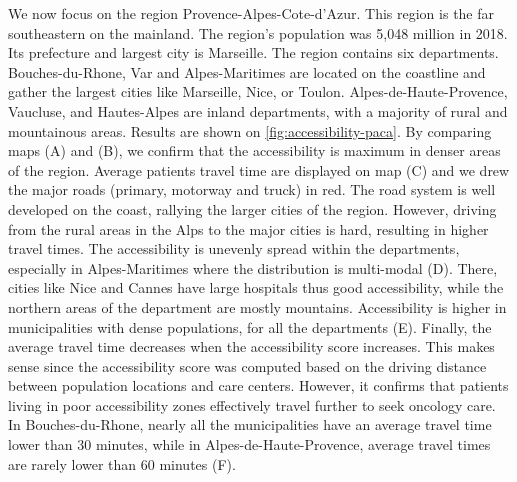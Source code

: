 We now focus on the region Provence-Alpes-Cote-d'Azur. This region is the far
southeastern on the mainland. The region's population was 5,048 million in 2018.
Its prefecture and largest city is Marseille. The region contains six
departments. Bouches-du-Rhone, Var and Alpes-Maritimes are located on the
coastline and gather the largest cities like Marseille, Nice, or Toulon.
Alpes-de-Haute-Provence, Vaucluse, and Hautes-Alpes are inland departments, with
a majority of rural and mountainous areas. Results are shown on
\cref{fig:accessibility-paca}. By comparing maps (A) and (B), we confirm that
the accessibility is maximum in denser areas of the region. Average patients
travel time are displayed on map (C) and we drew the major roads (primary,
motorway and truck) in red. The road system is well developed on the coast,
rallying the larger cities of the region. However, driving from the rural areas
in the Alps to the major cities is hard, resulting in higher travel times. The
accessibility is unevenly spread within the departments, especially in
Alpes-Maritimes where the distribution is multi-modal (D). There, cities like
Nice and Cannes have large hospitals thus good accessibility, while the northern
areas of the department are mostly mountains. Accessibility is higher in
municipalities with dense populations, for all the departments (E). Finally, the
average travel time decreases when the accessibility score increases. This makes
sense since the accessibility score was computed based on the driving distance
between population locations and care centers. However, it confirms that
patients living in poor accessibility zones effectively travel further to seek
oncology care. In Bouches-du-Rhone, nearly all the municipalities have an
average travel time lower than 30 minutes, while in Alpes-de-Haute-Provence,
average travel times are rarely lower than 60 minutes (F).

